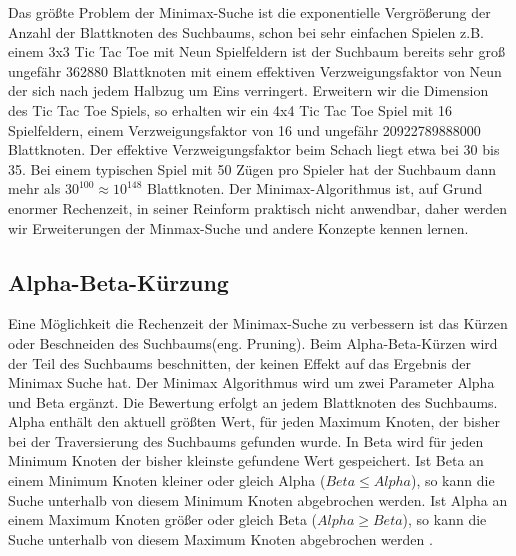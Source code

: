Das größte Problem der Minimax-Suche ist die exponentielle Vergrößerung der Anzahl der Blattknoten des Suchbaums, schon bei sehr einfachen Spielen z.B. einem 3x3 Tic Tac Toe mit Neun Spielfeldern ist der Suchbaum bereits sehr groß ungefähr 362880 Blattknoten mit einem effektiven Verzweigungsfaktor von Neun der sich nach jedem Halbzug um Eins verringert. Erweitern wir die Dimension des Tic Tac Toe Spiels, so erhalten wir ein 4x4 Tic Tac Toe Spiel mit 16 Spielfeldern, einem Verzweigungsfaktor von 16 und ungefähr 20922789888000 Blattknoten. Der effektive Verzweigungsfaktor beim Schach liegt etwa bei 30 bis 35. Bei einem typischen Spiel mit 50 Zügen pro Spieler hat der Suchbaum dann mehr als $30^{100} \approx 10^{148}$ Blattknoten\cite[114]{Ertel}. Der Minimax-Algorithmus ist, auf Grund enormer Rechenzeit, in seiner Reinform praktisch nicht anwendbar, daher werden wir Erweiterungen der Minmax-Suche und andere Konzepte kennen lernen.

\subsection{Alpha-Beta-Kürzung}
\label{subsec:Alpha-Beta-Kürzung}
Eine Möglichkeit die Rechenzeit der Minimax-Suche zu verbessern ist das Kürzen oder Beschneiden des Suchbaums(eng. Pruning). Beim Alpha-Beta-Kürzen wird der Teil des Suchbaums beschnitten, der keinen Effekt auf das Ergebnis der Minimax Suche hat. Der Minimax Algorithmus wird um zwei Parameter Alpha und Beta ergänzt. Die Bewertung erfolgt an jedem Blattknoten des Suchbaums. Alpha enthält den aktuell größten Wert, für jeden Maximum Knoten, der bisher bei der Traversierung des Suchbaums gefunden wurde. In Beta wird für jeden Minimum Knoten der bisher kleinste gefundene Wert gespeichert. Ist Beta an einem Minimum Knoten kleiner oder gleich Alpha ($Beta \leq Alpha$), so kann die Suche unterhalb von diesem Minimum Knoten abgebrochen werden. Ist Alpha an einem Maximum Knoten größer oder gleich Beta ($Alpha \geq Beta$), so kann die Suche unterhalb von diesem Maximum Knoten abgebrochen werden \cite[116]{Ertel}. \\

